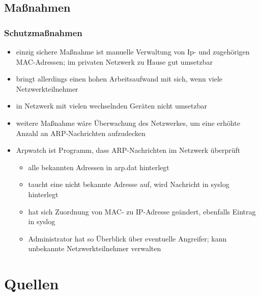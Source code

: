 \documentclass{beamer}
\begin{document}
    	\subsection*{Maßnahmen}
		\begin{frame}
        	\frametitle{Schutzmaßnahmen}
        	\begin{itemize}
        	\item einzig sichere Maßnahme ist manuelle Verwaltung von Ip- und zugehörigen MAC-Adressen; im privaten Netzwerk zu Hause gut umsetzbar
        	\item bringt allerdings einen hohen Arbeitsaufwand mit sich, wenn viele Netzwerkteilnehmer
        	\item in Netzwerk mit vielen wechselnden Geräten nicht umsetzbar
        	\item weitere Maßnahme wäre Überwachung des Netzwerkes, um eine erhöhte Anzahl an ARP-Nachrichten aufzudecken
        	\item Arpwatch ist Programm, dass ARP-Nachrichten im Netzwerk überprüft
        	\begin{itemize}
        	\item alle bekannten Adressen in arp.dat hinterlegt
        	\item taucht eine nicht bekannte Adresse auf, wird Nachricht in syslog hinterlegt
        	\item hat sich Zuordnung von MAC- zu IP-Adresse geändert, ebenfalls Eintrag in syslog
        	\item Administrator hat so Überblick über eventuelle Angreifer; kann unbekannte Netzwerkteilnehmer verwalten
        	\end{itemize}
        	\end{itemize}
                       	
    	\end{frame}

	\section{Quellen}
	
\end{document}
